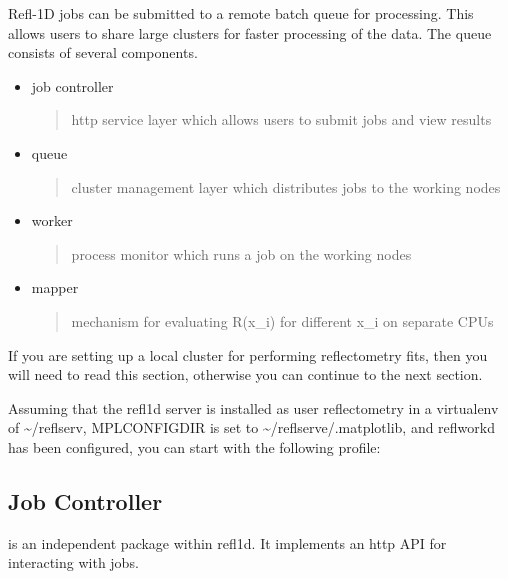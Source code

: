 \documentclass[letterpaper,10pt,english]{sphinxmanual}
\begin{document}
Refl-1D jobs can be submitted to a remote batch queue for processing.  This
allows users to share large clusters for faster processing of the data.  The
queue consists of several components.
\begin{itemize}
\item {} 
job controller
\begin{quote}

http service layer which allows users to submit jobs and view results
\end{quote}

\item {} 
queue
\begin{quote}

cluster management layer which distributes jobs to the working nodes
\end{quote}

\item {} 
worker
\begin{quote}

process monitor which runs a job on the working nodes
\end{quote}

\item {} 
mapper
\begin{quote}

mechanism for evaluating R(x\_i) for different x\_i on separate CPUs
\end{quote}

\end{itemize}

If you are setting up a local cluster for performing reflectometry
fits, then you will need to read this section, otherwise you can
continue to the next section.

Assuming that the refl1d server is installed as user reflectometry in
a virtualenv of \textasciitilde{}/reflserv, MPLCONFIGDIR is set to \textasciitilde{}/reflserve/.matplotlib,
and reflworkd has been configured, you can start with the following profile:


\subsection{Job Controller}
\label{getting_started/server:job-controller}
 is an independent package within refl1d.  It implements
an http API for interacting with jobs.
\end{document}
